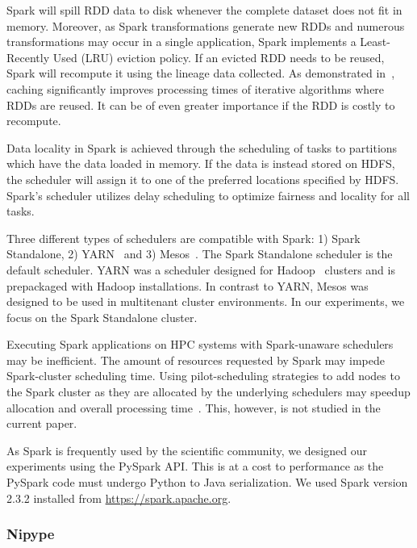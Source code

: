 \documentclass{IEEEtran}
\begin{document}
Spark will spill RDD data to disk whenever the complete dataset does not fit in
memory. Moreover, as Spark transformations generate new RDDs and numerous 
transformations may occur in a single application, Spark implements a Least-Recently Used (LRU) eviction
policy. If an evicted RDD needs to be reused, Spark will recompute it using the
lineage data collected. As demonstrated in~\cite{freeman2014mapping}, caching significantly improves processing times of iterative algorithms where 
RDDs are reused. It can be of even greater importance if the RDD is costly to 
recompute.

Data locality in Spark is achieved through the scheduling of tasks to partitions 
which have the
data loaded in memory. If the data is instead stored on HDFS, the scheduler will
assign it to one of the preferred locations specified by HDFS. Spark's scheduler
utilizes delay scheduling to optimize fairness and locality for all tasks.

Three different types of schedulers are compatible with Spark: 1) Spark 
Standalone, 2) YARN~\cite{vavilapalli2013apache} and 3) Mesos~\cite{hindman2011mesos}. The Spark Standalone
scheduler is the default scheduler. YARN was a scheduler designed for Hadoop~\cite{white2012hadoop}
clusters and is prepackaged with Hadoop installations. In contrast to YARN, 
Mesos was designed to be used in multitenant cluster environments. In our experiments,
we focus on the Spark Standalone cluster.

Executing Spark applications on HPC systems with Spark-unaware schedulers may
be inefficient. The amount of resources requested by Spark may impede 
Spark-cluster scheduling time. Using pilot-scheduling strategies to add 
nodes to the Spark cluster as they are allocated by the underlying 
schedulers may speedup allocation and overall processing time~\cite{paraskevakos2018pilot}. This, however, is not studied in the 
current paper.

As Spark is frequently used by the scientific community, we designed 
our experiments using the PySpark API. This is at a cost to performance 
as the PySpark code must undergo Python to Java serialization. We used Spark
version 2.3.2 installed from \url{https://spark.apache.org}.

\subsubsection{Nipype}
\end{document}
